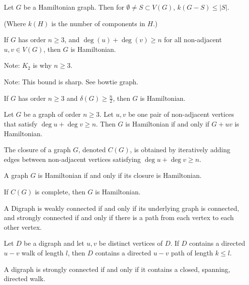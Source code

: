 \documentclass{article}
\begin{document}
    Let $G$ be a Hamiltonian graph. Then for $\emptyset \neq S \subset V(G)$, $k(G-S) \leq |S|$.

    (Where $k(H)$ is the number of components in $H$.)

\medskip{}

    If $G$ has order $n \geq 3$, and $\deg(u) + \deg(v) \geq n$ for all non-adjacent $u,v \in V(G)$, then $G$ is Hamiltonian.

    Note: $K_2$ is why $n \geq 3$.

    Note: This bound is sharp. See bowtie graph.

\medskip{}

    If $G$ has order $n \geq 3$ and $\delta(G) \geq \frac n2$, then $G$ is Hamiltonian.

\medskip{}

    Let $G$ be a graph of order $n \geq 3$. Let $u,v$ be one pair of non-adjacent vertices that satisfy $\deg u + \deg v \geq n$. Then $G$ is Hamiltonian if and only if $G+uv$ is Hamiltonian. 

\medskip{}

    The closure of a graph $G$, denoted $C(G)$, is obtained by iteratively adding edges between non-adjacent vertices satisfying $\deg u + \deg  v \geq n$.

\medskip{}

    A graph $G$ is Hamiltonian if and only if its closure is Hamiltonian.

\medskip{}

    If $C(G)$ is complete, then $G$ is Hamiltonian.

\medskip{}

    A Digraph is weakly connected if and only if its underlying graph is connected, and strongly connected if and only if there is a path from each vertex to each other vertex.

\medskip{}

    Let $D$ be a digraph and let $u,v$ be distinct vertices of $D$.
    If $D$ contains a directed $u-v$ walk of length $l$, then $D$ contains a directed $u-v$ path of length $k \leq l$.

\medskip{}

    A digraph is strongly connected if and only if it contains a closed, spanning, directed walk.
\end{document}
